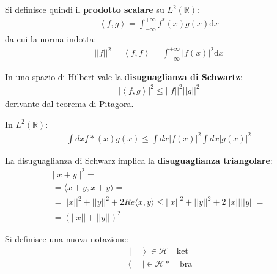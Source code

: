 Si definisce quindi il \textbf{prodotto scalare} su $L^2(\mathbb{R})$:
\begin{equation}\begin{split}
\left\langle f,g \right\rangle=\int_{-\infty }^{+\infty }{f^*\left(x\right)g\left(x\right) \textrm{d}x}
\end{split}\end{equation}
da cui la norma indotta:
\begin{equation}\begin{split}
||f||^2=\left\langle f,f \right\rangle=\int_{-\infty }^{+\infty }{|f\left(x\right)|^2 \textrm{d}x}
\end{split}\end{equation}

In uno spazio di Hilbert vale la \textbf{disuguaglianza di Schwartz}:
\begin{equation}\begin{split}
|\left\langle f,g \right\rangle|^2\le ||f||^2||g||^2
\end{split}\end{equation}
derivante dal teorema di Pitagora.

In $L^2(\mathbb R)$:
\begin{equation}\begin{split}
\int dx f*(x) g(x) \leq \int dx |f(x)|^2 \int dx |g(x)|^2
\end{split}\end{equation}

La disuguaglianza di Schwarz implica la \textbf{disuguaglianza triangolare}:
\begin{equation}\begin{split}
||x+y||^2=\\
=\langle x+y,x+y \rangle=\\
=||x||^2+||y||^2+2Re\langle x,y\rangle\le ||x||^2+||y||^2+2||x||||y||=\\
=\left(||x||+||y||\right)^2
\end{split}\end{equation}


Si definisce una nuova notazione:
\begin{equation}\begin{split}
\left | \quad \right\rangle \in \mathcal{H} \quad \textrm{ket}
\end{split}\end{equation}
\begin{equation}\begin{split}
\left\langle \quad  \right | \in \mathcal{H}* \quad \textrm{bra}
\end{split}\end{equation}

